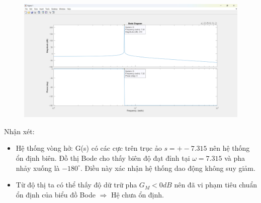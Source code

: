 \begin{figure}[H]
    \centering
    \includegraphics[width=1\textwidth]{pictures/bode.png}
\end{figure}
Nhận xét:
\begin{itemize}
    \item Hệ thống vòng hở: G(s) có các cực trên trục ảo $s=+-7.315$ nên hệ thống ổn định biên. Đồ thị Bode cho thấy biên độ đạt đỉnh tại $\omega=7.315$ và pha nhảy xuống là $-180^\circ$. Điều này xác nhận hệ thống dao động không suy giảm.
    \item Từ độ thị ta có thể thấy độ dữ trữ pha $G_M < 0 dB$ nên đã vi phạm tiêu chuẩn ổn định của biểu đồ Bode $\Rightarrow$ Hệ chưa ổn định. 
\end{itemize}
